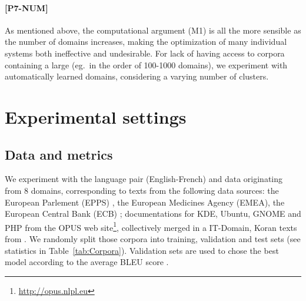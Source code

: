 \documentclass[11pt]{article}
\newcommand{\fyTodo}[1]{\Todo[FY:]{\textcolor{orange}{#1}}}
\begin{document}
\paragraph{[P7-NUM]} As mentioned above, the computational argument (M1) is all the more sensible as the number of domains increases, making the optimization of many individual systems both ineffective and undesirable. For lack of having access to corpora containing a large (eg.\ in the order of 100-1000 domains), we experiment with automatically learned domains, considering a varying number of clusters.

\section{Experimental settings \label{sec:experiments}}

\subsection{Data and metrics}
\fyTodo{This is a big mess, yet}
We experiment with the language pair (English-French) \fyTodo{Both ways ?} and data originating from 8 domains, corresponding to texts from the following data sources: the European Parlement (EPPS) \cite{Koehn05europarl}, 
the European Medicines Agency (EMEA), the European Central Bank (ECB) \cite{Tiedemann09news}; documentations for KDE, Ubuntu, GNOME and PHP from the OPUS web site\footnote{\url{http://opus.nlpl.eu}}, collectively merged in a IT-Domain, Koran texts from \cite{}.  
%
We randomly split those corpora into training, validation and test sets (see statistics in Table~\ref{tab:Corpora}).
Validation sets are used to chose the best model according to the average BLEU score \cite{Papineni02bleu}.


\end{document}
